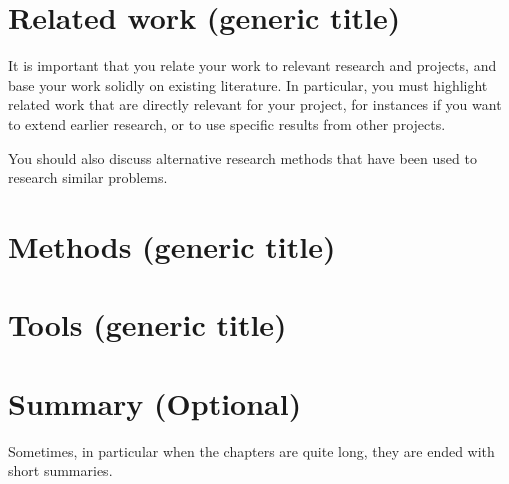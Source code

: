 \section{Related work (generic title)}\label{sec:related-work-(generic-title)}

It is important that you relate your work to relevant research and projects, and base your work solidly on existing literature.
In particular, you must highlight related work that are directly relevant for your project, for instances if you want to extend earlier research, or to use specific results from other projects.

You should also discuss alternative research methods that have been used to research similar problems.



\section{Methods (generic title)}\label{sec:methods-(generic-title)}


\section{Tools (generic title)}\label{sec:tools-(generic-title)}


\section{Summary (Optional)}\label{sec:summary-(optional)}

Sometimes, in particular when the chapters are quite long, they are ended with short summaries.
